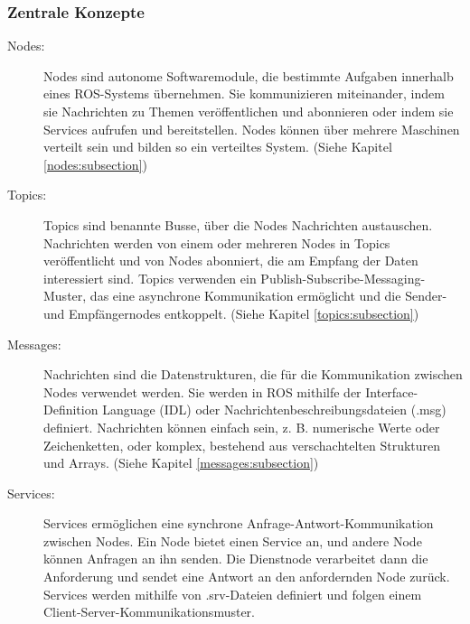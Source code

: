 \subsubsection{Zentrale Konzepte}
\begin{description}
    \item[Nodes:] Nodes sind autonome Softwaremodule, die bestimmte Aufgaben innerhalb eines ROS-Systems übernehmen. Sie kommunizieren miteinander, indem sie Nachrichten zu Themen veröffentlichen und abonnieren oder indem sie Services aufrufen und bereitstellen. Nodes können über mehrere Maschinen verteilt sein und bilden so ein verteiltes System. (Siehe Kapitel \ref{nodes:subsection})
    
    \item[Topics:] Topics sind benannte Busse, über die Nodes Nachrichten austauschen. Nachrichten werden von einem oder mehreren Nodes in Topics veröffentlicht und von Nodes abonniert, die am Empfang der Daten interessiert sind. Topics verwenden ein Publish-Subscribe-Messaging-Muster, das eine asynchrone Kommunikation ermöglicht und die Sender- und Empfängernodes entkoppelt. (Siehe Kapitel \ref{topics:subsection})
    
    \item[Messages:] Nachrichten sind die Datenstrukturen, die für die Kommunikation zwischen Nodes verwendet werden. Sie werden in ROS mithilfe der Interface-Definition Language (IDL) oder Nachrichtenbeschreibungsdateien (.msg) definiert. Nachrichten können einfach sein, z. B. numerische Werte oder Zeichenketten, oder komplex, bestehend aus verschachtelten Strukturen und Arrays. (Siehe Kapitel \ref{messages:subsection})
    
    \item[Services:] Services ermöglichen eine synchrone Anfrage-Antwort-Kommunikation zwischen Nodes. Ein Node bietet einen Service an, und andere Node können Anfragen an ihn senden. Die Dienstnode verarbeitet dann die Anforderung und sendet eine Antwort an den anfordernden Node zurück. Services werden mithilfe von .srv-Dateien definiert und folgen einem Client-Server-Kommunikationsmuster.
\end{description}

